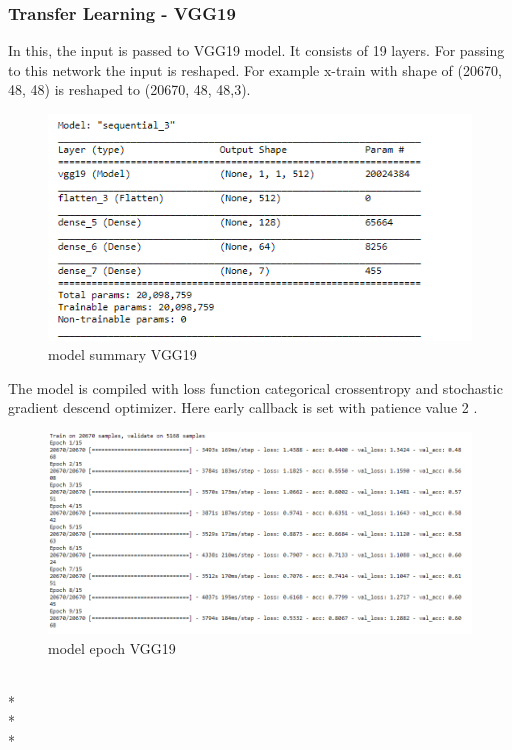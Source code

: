 \subsubsection{Transfer Learning - VGG19}
 In this, the input is passed to VGG19 model. It consists of 19 layers. For passing to this network the input is reshaped. For example x-train with shape of (20670, 48, 48) is reshaped to (20670, 48, 48,3).
\begin{figure}[h]
\label{ss}
\centering
\includegraphics[width= 18cm]{vgg19sum.PNG}
\caption{model summary VGG19}
\end{figure} 
The model is compiled with loss function categorical crossentropy and stochastic gradient descend optimizer. Here early callback is set with patience value 2 .
\begin{figure}[h]
\label{ss}
\centering
\includegraphics[width= 15cm]{vgg19epoch.PNG}
\caption{model epoch VGG19}
\end{figure}
 
 \\*
 \\*
 \\*
